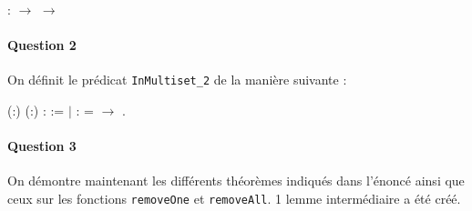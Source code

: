 \documentclass{report}
\begin{document}
\noindent\begin{coqdoccode}
\coqdocemptyline
\coqdocnoindent
{} :
 \ensuremath{\rightarrow}
 \ensuremath{\rightarrow}
\end{coqdoccode}

\paragraph{Question 2}

On définit le prédicat \texttt{InMultiset\_2} de la manière suivante :\\

\begin{coqdoccode}
\coqdocnoindent
{}  (:) (:) :  := \coqdoceol
\coqdocindent{1.00em}
\ensuremath{|}  :    =  \ensuremath{\rightarrow}   .\coqdoceol
\coqdocemptyline
\end{coqdoccode}

\paragraph{Question 3}

On démontre maintenant les différents théorèmes indiqués dans l’énoncé ainsi que ceux sur les fonctions \texttt{removeOne} et \texttt{removeAll}. 1 lemme intermédiaire a été créé.
\end{document}
